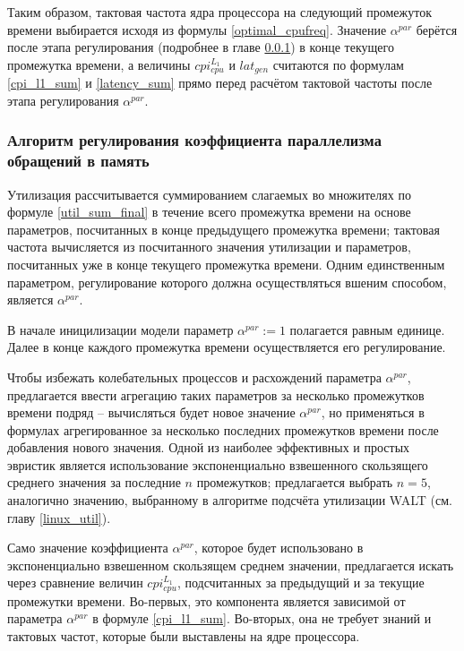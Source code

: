     Таким образом, тактовая частота ядра процессора на следующий промежуток времени выбирается исходя
    из формулы \eqref{optimal_cpufreq}. Значение $\alpha^{par}$ берётся после этапа регулирования
    (подробнее в главе \ref{alpha_regul}) в конце текущего промежутка времени, а величины
    $cpi_{cpu}^{L_1}$ и $lat_{gen}$ считаются по формулам \eqref{cpi_l1_sum} и \eqref{latency_sum}
    прямо перед расчётом тактовой частоты после этапа регулирования $\alpha^{par}$.

\subsubsection{Алгоритм регулирования коэффициента параллелизма обращений в память} \label{alpha_regul}

    Утилизация рассчитывается суммированием слагаемых во множителях по формуле \eqref{util_sum_final}
    в течение всего промежутка времени на основе параметров, посчитанных в конце предыдущего промежутка
    времени; тактовая частота вычисляется из посчитанного значения утилизации и параметров, посчитанных
    уже в конце текущего промежутка времени. Одним единственным параметром, регулирование которого должна
    осуществляться вшеним способом, является $\alpha^{par}$.

    В начале иницилизации модели параметр $\alpha^{par} := 1$ полагается равным единице. Далее в конце
    каждого промежутка времени осуществляется его регулирование.

    Чтобы избежать колебательных процессов и расхождений параметра $\alpha^{par}$, предлагается
    ввести агрегацию таких параметров за несколько промежутков времени подряд -- вычисляться будет
    новое значение $\alpha^{par}$, но применяться в формулах агрегированное за несколько последних
    промежутков времени после добавления нового значения. Одной из наиболее эффективных и простых
    эвристик является использование экспоненциально взвешенного скользящего среднего значения за
    последние $n$ промежутков; предлагается выбрать $n = 5$, аналогично значению, выбранному в алгоритме
    подсчёта утилизации WALT (см. главу \ref{linux_util}).

    Само значение коэффициента $\alpha^{par}$, которое будет использовано в экспоненциально взвешенном
    скользящем среднем значении, предлагается искать через сравнение величин $cpi_{cpu}^{L_1}$,
    подсчитанных за предыдущий и за текущие промежутки времени. Во-первых, это компонента является
    зависимой от параметра $\alpha^{par}$ в формуле \eqref{cpi_l1_sum}. Во-вторых, она не требует
    знаний и тактовых частот, которые были выставлены на ядре процессора.

